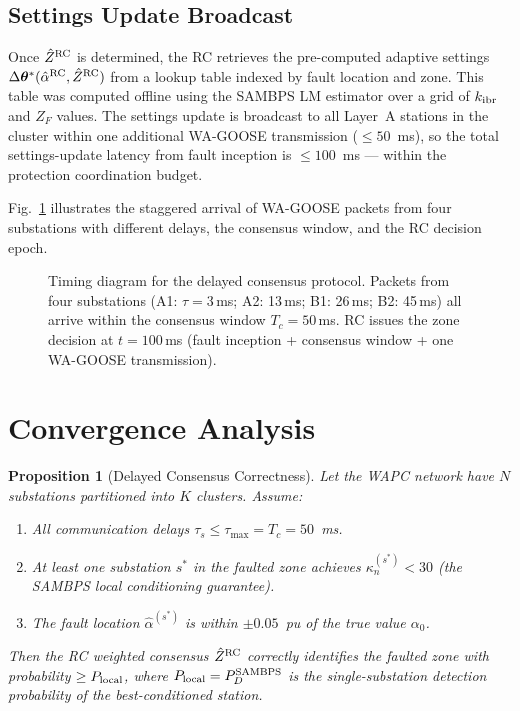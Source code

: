 \documentclass[journal]{IEEEtran}
\newtheorem{proposition}{Proposition}
\newcommand{\kibr}{k_{\rm ibr}}
\newcommand{\kappan}{\kappa_n}
\newcommand{\Tc}{T_c}
\newcommand{\taumax}{\tau_{\max}}
\newcommand{\ZF}{Z_F}
\begin{document}
\subsection{Settings Update Broadcast}

Once $\hat{Z}^{\rm RC}$ is determined, the RC retrieves the pre-computed
adaptive settings $\Delta\bm{\theta}^\ast(\hat{\alpha}^{\rm RC}, \hat{Z}^{\rm RC})$
from a lookup table indexed by fault location and zone.  This table was
computed offline using the SAMBPS LM estimator over a grid of $\kibr$ and
$\ZF$ values.  The settings update is broadcast to all Layer~A stations
in the cluster within one additional WA-GOOSE transmission ($\leq 50$~ms),
so the total settings-update latency from fault inception is
$\leq 100$~ms — within the protection coordination budget.

Fig.~\ref{fig:timing} illustrates the staggered arrival of WA-GOOSE
packets from four substations with different delays, the consensus
window, and the RC decision epoch.

\begin{figure}[htbp]
  \centering
  
  \caption{Timing diagram for the delayed consensus protocol.  Packets
           from four substations (A1: $\tau{=}3$\,ms; A2: 13\,ms;
           B1: 26\,ms; B2: 45\,ms) all arrive within the consensus
           window $T_c{=}50$\,ms.  RC issues the zone decision at
           $t{=}100$\,ms (fault inception + consensus window +
           one WA-GOOSE transmission).}
  \label{fig:timing}
\end{figure}

\section{Convergence Analysis}
\label{sec:convergence}

\begin{proposition}[Delayed Consensus Correctness]
\label{prop:consensus}
Let the WAPC network have $N$ substations partitioned into $K$ clusters.
Assume:
\begin{enumerate}[\normalfont(a)]
  \item All communication delays $\tau_s \leq \taumax = \Tc = 50$~ms.
  \item At least one substation $s^\ast$ in the faulted zone achieves
        $\kappan^{(s^\ast)} < 30$ (the SAMBPS local conditioning
        guarantee).
  \item The fault location $\hat{\alpha}^{(s^\ast)}$ is within
        $\pm 0.05$~pu of the true value $\alpha_0$.
\end{enumerate}
Then the RC weighted consensus $\hat{Z}^{\rm RC}$ correctly identifies
the faulted zone with probability $\geq P_{\rm local}$, where
$P_{\rm local} = P_D^{\rm SAMBPS}$ is the single-substation detection
probability of the best-conditioned station.
\end{proposition}
\end{document}
